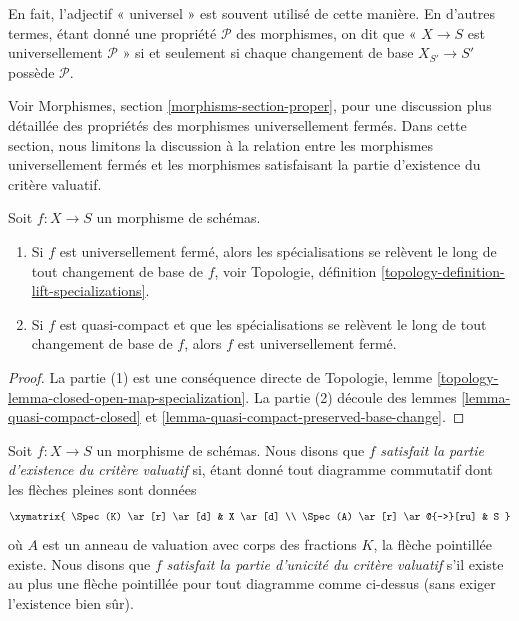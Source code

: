 \noindent
En fait, l’adjectif « universel » est souvent utilisé de cette manière. En
d’autres termes, étant donné une propriété $\mathcal{P}$ des morphismes,
on dit que « $X \to S$ est universellement $\mathcal{P}$ » si et
seulement si chaque changement de base $X_{S'} \to S'$ possède $\mathcal{P}$.

\medskip\noindent
Voir Morphismes, section \ref{morphisms-section-proper}, pour une
discussion plus détaillée des propriétés des morphismes universellement fermés.
Dans cette section, nous limitons la discussion à la relation entre les
morphismes universellement fermés et les morphismes satisfaisant
la partie d'existence du critère valuatif.

\begin{lemma}
\label{lemma-specializations-lift}
Soit $f : X \to S$ un morphisme de schémas.
\begin{enumerate}
\item Si $f$ est universellement fermé, alors les spécialisations se relèvent
le long de tout changement de base de
$f$, voir Topologie, définition \ref{topology-definition-lift-specializations}. \item
Si $f$ est quasi-compact et que les spécialisations se relèvent le
long de tout changement de base de $f$, alors $f$ est universellement fermé.
\end{enumerate}
\end{lemma}

\begin{proof}
La partie (1) est une conséquence directe
de Topologie, lemme \ref{topology-lemma-closed-open-map-specialization}.
La partie (2) découle
des lemmes \ref{lemma-quasi-compact-closed}
et \ref{lemma-quasi-compact-preserved-base-change}.
\end{proof}

\begin{definition}
\label{definition-valuative-criterion}
Soit $f : X \to S$ un morphisme de schémas. Nous disons que $f$ {\it
satisfait la partie d'existence du critère valuatif} si, étant donné tout diagramme
commutatif dont les flèches pleines sont données
$$
\xymatrix{
\Spec(K) \ar[r] \ar[d] & X \ar[d] \\
\Spec(A) \ar[r] \ar@{-->}[ru] & S
}
$$
où $A$ est un anneau de valuation avec corps des fractions $K$, la
flèche pointillée existe. Nous disons que $f$ {\it satisfait la
partie d'unicité du critère valuatif} s'il existe au plus une flèche
pointillée pour tout diagramme comme ci-dessus (sans exiger
l'existence bien sûr).
\end{definition}


